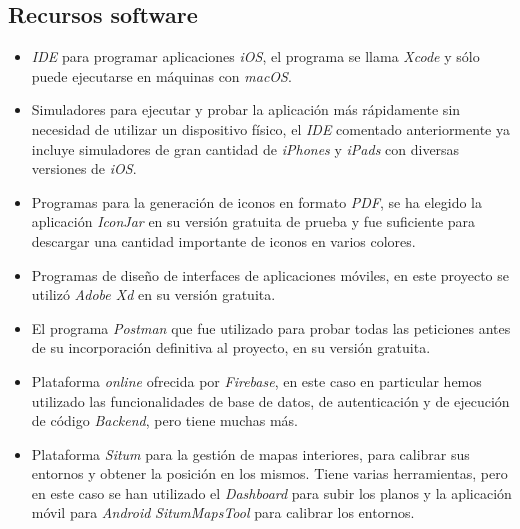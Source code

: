\subsection*{Recursos software}
\begin{itemize}
\item \textit{IDE} para programar aplicaciones \textit{iOS}, el programa se llama \textit{Xcode} y sólo puede ejecutarse en máquinas con \textit{macOS}.
\item Simuladores para ejecutar y probar la aplicación más rápidamente sin necesidad de utilizar un dispositivo físico, el \textit{IDE} comentado anteriormente ya incluye simuladores de gran cantidad de \textit{iPhones} y \textit{iPads} con diversas versiones de \textit{iOS}.
\item Programas para la generación de iconos en formato \textit{PDF}, se ha elegido la aplicación \textit{IconJar} en su versión gratuita de prueba y fue suficiente para descargar una cantidad importante de iconos en varios colores.
\item Programas de diseño de interfaces de aplicaciones móviles, en este proyecto se utilizó \textit{Adobe Xd} en su versión gratuita.
\item El programa \textit{Postman} que fue utilizado para probar todas las peticiones antes de su incorporación definitiva al proyecto, en su versión gratuita.
\item Plataforma \textit{online} ofrecida por \textit{Firebase}, en este caso en particular hemos utilizado las funcionalidades de base de datos, de autenticación y de ejecución de código \textit{Backend}, pero tiene muchas más.
\item Plataforma \textit{Situm} para la gestión de mapas interiores, para calibrar sus entornos y obtener la posición en los mismos. Tiene varias herramientas, pero en este caso se han utilizado el \textit{Dashboard} para subir los planos y la aplicación móvil para \textit{Android} \textit{SitumMapsTool} para calibrar los entornos.
\end{itemize}

